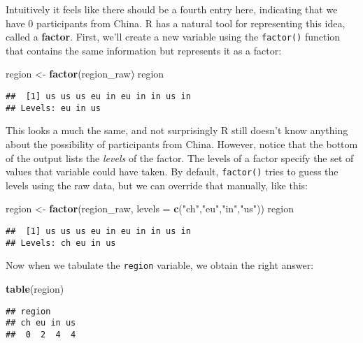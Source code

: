 \documentclass[]{book}
\newenvironment{Shaded}{\begin{snugshade}}{\end{snugshade}}
\newcommand{\DataTypeTok}[1]{\textcolor[rgb]{0.13,0.29,0.53}{#1}}
\newcommand{\KeywordTok}[1]{\textcolor[rgb]{0.13,0.29,0.53}{\textbf{#1}}}
\newcommand{\NormalTok}[1]{#1}
\newcommand{\StringTok}[1]{\textcolor[rgb]{0.31,0.60,0.02}{#1}}
\begin{document}
Intuitively it feels like there should be a fourth entry here, indicating that we have 0 participants from China. R has a natural tool for representing this idea, called a \textbf{factor}. First, we'll create a new variable using the \texttt{factor()} function that contains the same information but represents it as a factor:

\begin{Shaded}
\begin{Highlighting}[]
\NormalTok{region <-}\StringTok{ }\KeywordTok{factor}\NormalTok{(region_raw)}
\NormalTok{region}
\end{Highlighting}
\end{Shaded}

\begin{verbatim}
##  [1] us us us eu in eu in in us in
## Levels: eu in us
\end{verbatim}

This looks a much the same, and not surprisingly R still doesn't know anything about the possibility of participants from China. However, notice that the bottom of the output lists the \emph{levels} of the factor. The levels of a factor specify the set of values that variable could have taken. By default, \texttt{factor()} tries to guess the levels using the raw data, but we can override that manually, like this:

\begin{Shaded}
\begin{Highlighting}[]
\NormalTok{region <-}\StringTok{ }\KeywordTok{factor}\NormalTok{(region_raw, }\DataTypeTok{levels =} \KeywordTok{c}\NormalTok{(}\StringTok{"ch"}\NormalTok{,}\StringTok{"eu"}\NormalTok{,}\StringTok{"in"}\NormalTok{,}\StringTok{"us"}\NormalTok{))}
\NormalTok{region}
\end{Highlighting}
\end{Shaded}

\begin{verbatim}
##  [1] us us us eu in eu in in us in
## Levels: ch eu in us
\end{verbatim}

Now when we tabulate the \texttt{region} variable, we obtain the right answer:

\begin{Shaded}
\begin{Highlighting}[]
\KeywordTok{table}\NormalTok{(region)}
\end{Highlighting}
\end{Shaded}

\begin{verbatim}
## region
## ch eu in us 
##  0  2  4  4
\end{verbatim}
\end{document}
